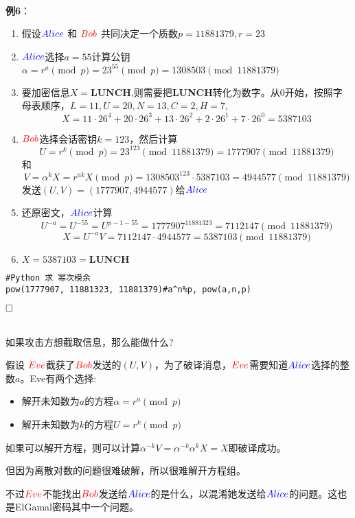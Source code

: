 \documentclass{article}
\begin{document}
~\\

\textbf{例6}：

\begin{enumerate}
\item 假设${\color{blue}Alice}$ 和 ${\color{red}Bob}$ 共同决定一个质数$p=11881379,r = 23$
\item  ${\color{blue}Alice}$选择$a = 55$计算公钥$\alpha = r^{a} \pmod{p}= 23^{55} \pmod{p} = 1308503 \pmod{11881379}$
\item  要加密信息$X = \textbf{LUNCH}$,则需要把\textbf{LUNCH}转化为数字。从0开始，按照字母表顺序，$L = 11,U = 20, N = 13, C = 2, H = 7$,$$X = 11 \cdot 26^4 + 20 \cdot 26^3 +13 \cdot 26^2 +2 \cdot 26^1 +7 \cdot 26^0 = 5387103  $$
\item  ${\color{red}Bob}$选择会话密钥$k=123$，然后计算
$$U = r^k \pmod{p} = 23^{123} \pmod{11881379} = 1777907 \pmod{11881379} $$
和
$$V = \alpha^kX = r^{ak}X \pmod{p} = 1308503^{123} \cdot 5387103 = 4944577 \pmod{11881379}$$
发送$(U,V) = (1777907,4944577)$给${\color{blue}Alice}$
\item 还原密文，${\color{blue}Alice}$计算
$$U^{-a} = U^{-55} =U^{p -1 -55} = 1777907^{11881323} = 7112147 \pmod{11881379}$$
$$X = U^{-a}V =7112147 \cdot 4944577 = 5387103 \pmod{11881379}$$
\item $X=5387103 = \textbf{LUNCH}$ 
\end{enumerate}

\begin{lstlisting}
#Python 求 幂次模余
pow(1777907, 11881323, 11881379)#a^n%p, pow(a,n,p)
\end{lstlisting} $\hfill\square$ 

~\\

如果攻击方想截取信息，那么能做什么?

假设 ${\color{red}Eve}$截获了${\color{red}Bob}$发送的$(U,V)$，为了破译消息，${\color{red}Eve}$需要知道${\color{blue}Alice}$选择的整数$a$。Eve有两个选择:
\begin{itemize}
\item 解开未知数为$a$的方程$\alpha = r^{a} \pmod{p}$
\item 解开未知数为$k$的方程$U = r^k \pmod{p}$
\end{itemize}

如果可以解开方程，则可以计算$\alpha^{-k}V =  \alpha^{-k}\alpha^{k}X = X$即破译成功。

但因为离散对数的问题很难破解，所以很难解开方程组。

不过${\color{red}Eve}$不能找出${\color{red}Bob}$发送给${\color{blue}Alice}$的是什么，以混淆她发送给${\color{blue}Alice}$的问题。这也是ElGamal密码其中一个问题。
\end{document}
